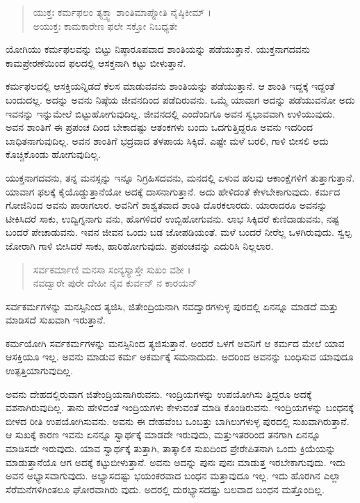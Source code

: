 \begin{verse}
ಯುಕ್ತಃ ಕರ್ಮಫಲಂ ತ್ಯಕ್ತ್ವಾ ಶಾಂತಿಮಾಪ್ನೋತಿ ನೈಷ್ಠಿಕೀಮ್ ।\\ಅಯುಕ್ತಃ ಕಾಮಕಾರೇಣ ಫಲೇ ಸಕ್ತೋ ನಿಬಧ್ಯತೇ 
\end{verse}

{\small ಯೋಗಿಯು ಕರ್ಮಫಲವನ್ನು ಬಿಟ್ಟು ನಿಷ್ಠಾರೂಪವಾದ ಶಾಂತಿಯನ್ನು ಪಡೆಯುತ್ತಾನೆ. ಯುಕ್ತನಾಗದವನು ಕಾಮಪ್ರೇರಣೆಯಿಂದ ಫಲದಲ್ಲಿ ಆಸಕ್ತನಾಗಿ ಕಟ್ಟು ಬೀಳುತ್ತಾನೆ.}

ಕರ್ಮಫಲದಲ್ಲಿ ಆಸಕ್ತಿಯನ್ನಿಡದೆ ಕೆಲಸ ಮಾಡುವವನು ಶಾಂತಿಯನ್ನು ಪಡೆಯುತ್ತಾನೆ. ಆ ಶಾಂತಿ ಇದ್ದಕ್ಕೆ ಇದ್ದಂತೆ ಬಂದುದಲ್ಲ. ಅದನ್ನು ಅವನು ನಿಷ್ಠೆಯ ಜೀವನದಿಂದ ಪಡೆದಿರುವನು. ಒಮ್ಮೆ ಯಾವಾಗ ಅದನ್ನು ಪಡೆಯುವನೋ ಅದು ಇವನನ್ನು ಇನ್ನುಮೇಲೆ ಬಿಟ್ಟುಹೋಗುವುದಿಲ್ಲ. ಜೀವನದಲ್ಲಿ ಎಂದೆಂದಿಗೂ ಅವನ ಸ್ವಭಾವವಾಗಿ ಉಳಿಯುವುದು. ಅವನ ಶಾಂತಿಗೆ ಈ ಪ್ರಪಂಚ ದಿಂದ ಬೇಕಾದಷ್ಟು ಆತಂಕಗಳು ಬಂದು ಒದಗುತ್ತಿದ್ದರೂ ಅವನು ಇದರಿಂದ ಬಾಧಿತನಾಗುವುದಿಲ್ಲ. ಅವನ ಶಾಂತಿಗೆ ಭದ್ರವಾದ ತಳಪಾಯ ಸಿಕ್ಕಿದೆ. ಎಷ್ಟೇ ಮಳೆ ಬರಲಿ, ಗಾಳಿ ಬೀಸಲಿ ಅದು ಕೊಚ್ಚಿಕೊಂಡು ಹೋಗುವುದಿಲ್ಲ.

ಯುಕ್ತನಾಗದವನು, ತನ್ನ ಮನಸ್ಸನ್ನು ಇನ್ನೂ ನಿಗ್ರಹಿಸದವನು, ಮನದಲ್ಲಿ ಏಳುವ ಹಲವು ಆಕಾಂಕ್ಷೆಗಳಿಗೆ ತುತ್ತಾಗುತ್ತಾನೆ. ಯಾವಾಗ ಫಲಕ್ಕೆ ಕೈಯೊಡ್ಡುತ್ತಾನೆಯೋ ಅದಕ್ಕೆ ದಾಸನಾಗುತ್ತಾನೆ. ಅದು ಹೇಳಿದಂತೆ ಕೇಳಬೇಕಾಗುವುದು. ಕರ್ಮದ ಗೋಜಿನಿಂದ ಅವನು ಪಾರಾಗಲಾರ. ಅವನಿಗೆ ಶಾಶ್ವತವಾದ ಶಾಂತಿ ದೊರಕಲಾರದು. ಯಾರಾದರೂ ಅವನನ್ನು ಟೀಕಿಸಿದರೆ ಸಾಕು, ಉದ್ವಿಗ್ನನಾಗು ವನು, ಹೊಗಳಿದರೆ ಉಬ್ಬಿಹೋಗುವನು. ಲಾಭ ಸಿಕ್ಕಿದರೆ ಕುಣಿದಾಡುವನು, ನಷ್ಟ ಬಂದರೆ ಪೇಚಾಡುವನು. ಇವನ ಜೀವನ ಒಂದು ಬಡ ಜೋಪಡಿಯಂತೆ. ಮಳೆ ಬಂದರೆ ನೀರೆಲ್ಲ ಒಳಗಿರುವುದು. ಸ್ವಲ್ಪ ಜೋರಾಗಿ ಗಾಳಿ ಬೀಸಿದರೆ ಸಾಕು, ಹಾರಿಹೋಗುವುದು. ಪ್ರಪಂಚವನ್ನು ಎದುರಿಸಿ ನಿಲ್ಲಲಾರ.

\begin{verse}
ಸರ್ವಕರ್ಮಾಣಿ ಮನಸಾ ಸಂನ್ಯಸ್ಯಾಸ್ತೇ ಸುಖಂ ವಶೀ ।\\ನವದ್ವಾರೇ ಪುರೇ ದೇಹೀ ನೈವ ಕುರ್ವನ್ ನ ಕಾರಯನ್ 
\end{verse}

{\small ಸರ್ವಕರ್ಮಗಳನ್ನು ಮನಸ್ಸಿನಿಂದ ತ್ಯಜಿಸಿ, ಜಿತೇಂದ್ರಿಯನಾಗಿ ನವದ್ವಾರಗಳುಳ್ಳ ಪುರದಲ್ಲಿ ಏನನ್ನೂ ಮಾಡದೆ ಮತ್ತು ಮಾಡಿಸದೆ ಸುಖವಾಗಿ ಇರುತ್ತಾನೆ.}

ಕರ್ಮಯೋಗಿ ಸರ್ವಕರ್ಮಗಳನ್ನು ಮನಸ್ಸಿನಿಂದ ತ್ಯಜಿಸುತ್ತಾನೆ. ಅಂದರೆ ಒಳಗೆ ಅವನಿಗೆ ಆ ಕರ್ಮದ ಮೇಲೆ ಯಾವ ಆಸಕ್ತಿಯೂ ಇಲ್ಲ. ಅವನು ಮಾಡುವ ಕರ್ಮ ಅಕರ್ಮಕ್ಕೆ ಸಮನಾದುದು. ಅದರಿಂದ ಅವನನ್ನು ಬಂಧಿಸುವ ಯಾವುದೂ ಉತ್ಪತ್ತಿಯಾಗುವುದಿಲ್ಲ.

ಅವನು ದೇಹದಲ್ಲಿರುವಾಗ ಜಿತೇಂದ್ರಿಯನಾಗಿರುವನು. ಇಂದ್ರಿಯಗಳನ್ನು ಉಪಯೋಗಿಸು ತ್ತಿದ್ದರೂ ಅದಕ್ಕೆ ವಶನಾಗಿರುವುದಿಲ್ಲ. ತಾನು ಹೇಳಿದಂತೆ ಇಂದ್ರಿಯಗಳು ಕೇಳುವಂತೆ ಮಾಡಿ ಕೊಂಡಿರುವನು. ಇಂದ್ರಿಯಗಳನ್ನು ಬಂಧನಕ್ಕೆ ಬೀಳದ ರೀತಿ ಉಪಯೋಗಿಸುವನು. ಅವನು ಈ ದೇಹವೆಂಬ ಒಂಬತ್ತು ಬಾಗಿಲುಗಳುಳ್ಳ ಪುರದಲ್ಲಿ ಸುಖವಾಗಿರುತ್ತಾನೆ. ಆ ಸುಖಕ್ಕೆ ಕಾರಣ ಇವನು ಏನನ್ನೂ ಸ್ವಾರ್ಥಕ್ಕೆ ಮಾಡದೇ ಇರುವುದು, ಮತ್ತುಇತರರಿಂದ ತನಗಾಗಿ ಏನನ್ನೂ ಮಾಡಿಸದೇ ಇರುವುದು. ಯಾವ ಸ್ವಾರ್ಥಕ್ಕೆ ತುತ್ತಾಗಿ, ತಾತ್ಕಾಲಿಕ ಸುಖದಿಂದ ಪ್ರೇರೇಪಿತನಾಗಿ ಒಂದು ಕ್ರಿಯೆಯನ್ನು ಮಾಡುತ್ತಾನೆಯೊ ಆಗ ಅದಕ್ಕೆ ಕಟ್ಟುಬೀಳುತ್ತಾನೆ. ಅವನು ಅದನ್ನು ಪುನಃ ಪುನಃ ಮಾಡುತ್ತ ಇರಬೇಕಾಗುವುದು. ಇದು ಅವನ ಅಭ್ಯಾಸವಾಗುವುದು. ಅಭ್ಯಾಸದಷ್ಟು ಭಯಂಕರವಾದ ಬಂಧನ ಮತ್ತಾವುದೂ ಇಲ್ಲ. ಇದು ಹೊರಗಿನ ಎಲ್ಲಾ ಸೆರೆಮನೆಗಳಿಗಿಂತಲೂ ಘೋರವಾಗಿರು ವುದು. ಅದರಲ್ಲಿ ದುರಭ್ಯಾಸದಷ್ಟು ಬಲವಾದ ಬಂಧನ ಮತ್ತೊಂದಿಲ್ಲ.

